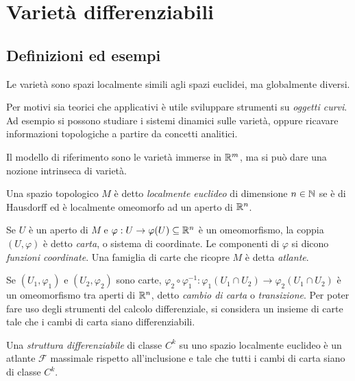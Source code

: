 \chapter{Varietà differenziabili}

\section{Definizioni ed esempi}
 
 Le varietà sono spazi localmente simili agli spazi euclidei, ma globalmente diversi.
 
 Per motivi sia teorici che applicativi è utile sviluppare strumenti su \emph{oggetti curvi}.
 Ad esempio si possono studiare i sistemi dinamici sulle varietà, oppure ricavare
 informazioni topologiche a partire da concetti analitici.
 
 Il modello di riferimento sono le varietà immerse in $\mathbb R^m$, ma si può dare
 una nozione intrinseca di varietà.
 
 \begin{definition} 
 Una spazio topologico $M$ è detto \emph{localmente euclideo} di dimensione $n\in\mathbb N$ se è di Hausdorff ed è localmente omeomorfo ad un aperto di $\mathbb R^n$.
 \end{definition}
 
 \begin{definition}   
 Se $U$ è un aperto di $M$ e $\varphi:U\to \varphi(U)\subseteq \mathbb R^n$
 è un omeomorfismo, la coppia $(U, \varphi)$ è detto \emph{carta}, o sistema di coordinate.
 Le componenti di $\varphi$ si dicono \emph{funzioni coordinate}. Una famiglia di carte
 che ricopre $M$ è detta \emph{atlante}.
 \end{definition}
 
 Se $(U_1, \varphi_1)$ e $(U_2, \varphi_2)$ sono carte, $\varphi_2\circ\varphi_1^{-1}:\varphi_1(U_1\cap U_2)\to\varphi_2(U_1\cap U_2)$
 è un omeomorfismo tra aperti di $\mathbb R^n$, detto \emph{cambio di carta} o \emph{transizione}.
 Per poter fare uso degli strumenti del calcolo differenziale, si considera un insieme
 di carte tale che i cambi di carta siano differenziabili.
 
 \begin{definition} 
 Una \emph{struttura differenziabile} di classe $C^k$ su uno
 spazio localmente euclideo è un atlante $\mathcal F$ massimale rispetto all'inclusione e tale che tutti i cambi di carta siano
 di classe $C^k$.
 \end{definition}
 
